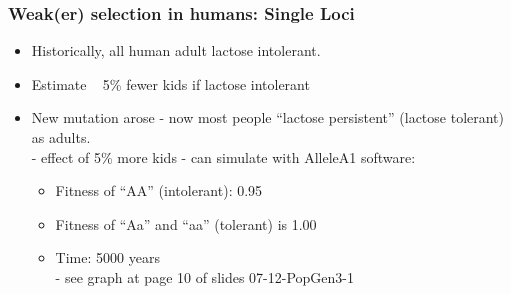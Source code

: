 \documentclass{scrartcl}
\begin{document}
\subsubsection{Weak(er) selection in humans: Single Loci}
\label{sec:07-01-03}
\begin{itemize}
\item Historically, all human adult lactose intolerant. 
\item Estimate ~ 5\% fewer kids if lactose intolerant
\item New mutation arose - now most people ``lactose persistent'' (lactose tolerant) as adults.\\
- effect of 5\% more kids - can simulate with AlleleA1 software:
\begin{itemize}
\item Fitness of ``AA'' (intolerant): 0.95
\item Fitness of ``Aa'' and ``aa'' (tolerant) is 1.00
\item Time: 5000 years\\
- see graph at page 10 of slides 07-12-PopGen3-1
\end{itemize}
\end{itemize}
\end{document}
